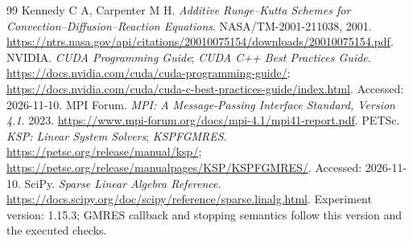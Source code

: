 \begin{thebibliography}{99}
 Kennedy C A, Carpenter M H. \emph{Additive Runge--Kutta Schemes for Convection--Diffusion--Reaction Equations}. NASA/TM-2001-211038, 2001. \url{https://ntrs.nasa.gov/api/citations/20010075154/downloads/20010075154.pdf}.
 NVIDIA. \emph{CUDA Programming Guide}; \emph{CUDA C++ Best Practices Guide}. \url{https://docs.nvidia.com/cuda/cuda-programming-guide/}; \url{https://docs.nvidia.com/cuda/cuda-c-best-practices-guide/index.html}. Accessed: 2026-11-10.
 MPI Forum. \emph{MPI: A Message-Passing Interface Standard, Version 4.1}. 2023. \url{https://www.mpi-forum.org/docs/mpi-4.1/mpi41-report.pdf}.
 PETSc. \emph{KSP: Linear System Solvers}; \emph{KSPFGMRES}. \url{https://petsc.org/release/manual/ksp/}; \url{https://petsc.org/release/manualpages/KSP/KSPFGMRES/}. Accessed: 2026-11-10.
 SciPy. \emph{Sparse Linear Algebra Reference}. \url{https://docs.scipy.org/doc/scipy/reference/sparse.linalg.html}. Experiment version: 1.15.3; GMRES callback and stopping semantics follow this version and the executed checks.
\end{thebibliography}

